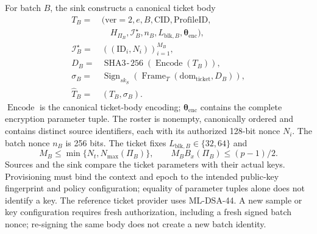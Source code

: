For batch $B$, the sink constructs a canonical ticket body
\begin{equation}
 \begin{aligned}
  T_B={}&(\mathrm{ver}=2,e,B,\mathrm{CID},\mathrm{ProfileID},\\
       &\quad H_{\Pi_B},\mathcal{I}^{\star}_B,n_B,
                L_{\mathrm{blk},B},\boldsymbol{\theta}_{\mathrm{enc}}),\\
  \mathcal{I}^{\star}_B={}&((\mathrm{ID}_i,N_i))_{i=1}^{M_B},\\
  D_B={}&\operatorname{SHA3\!\text{-}\!256}(\operatorname{Encode}(T_B)),\\
  \sigma_B={}&\operatorname{Sign}_{sk_S}
                   (\operatorname{Frame}_{T}(\mathrm{dom}_{\mathrm{ticket}},D_B)),\\
  \widehat{T}_B={}&(T_B,\sigma_B).
 \end{aligned}
 \label{eq:daahe_protocol_ticket}
\end{equation}
$\operatorname{Encode}$ is the canonical ticket-body encoding;
$\boldsymbol{\theta}_{\mathrm{enc}}$ contains the complete encryption parameter
tuple. The roster is nonempty, canonically ordered and contains distinct source
identifiers, each with its authorized 128-bit nonce $N_i$. The batch nonce
$n_B$ is 256 bits. The ticket fixes $L_{\mathrm{blk},B}\in\{32,64\}$ and
\begin{equation}
 M_B\leq\min\{N_t,N_{\max}(\Pi_B)\},\qquad
 M_B B_x(\Pi_B)\leq(p-1)/2.
 \label{eq:daahe_protocol_roster_capacity}
\end{equation}
Sources and the sink compare the ticket parameters with their actual keys.
Provisioning must bind the context and epoch to the intended public-key
fingerprint and policy configuration; equality of parameter tuples alone does
not identify a key. The reference ticket provider uses ML-DSA-44. A new sample
or key configuration requires fresh authorization, including a fresh signed
batch nonce; re-signing the same body does not create a new batch identity.

